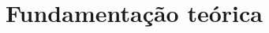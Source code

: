 \documentclass[../../layout.tex]{subfiles}
\begin{document}
\chapter{Fundamentação teórica}
\blindtext
\end{document}
